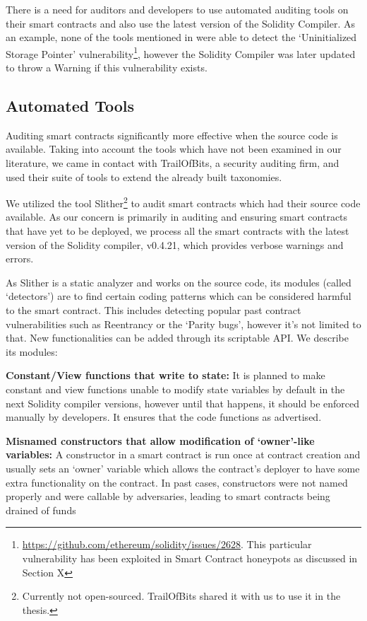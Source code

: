 There is a need for auditors and developers to use automated auditing tools on their smart contracts and also use the latest version of the Solidity  Compiler. As an example, none of the tools mentioned in \cite{tools} were able to detect the `Uninitialized Storage Pointer' vulnerability\footnote{\url{https://github.com/ethereum/solidity/issues/2628}. This particular vulnerability has been exploited in Smart Contract honeypots as discussed in Section X}, however the Solidity Compiler was later updated to throw a Warning if this vulnerability exists. 

\subsection{Automated Tools}

Auditing smart contracts significantly more effective when the source code is available. Taking into account the tools which have not been examined in our literature, we came in contact with TrailOfBits, a security auditing firm, and used their suite of tools to extend the already built taxonomies.

We utilized the tool Slither\footnote{Currently not open-sourced. TrailOfBits shared it with us to use it in the thesis.} to audit smart contracts which had their source code available. As our concern is primarily in auditing and ensuring smart contracts that have yet to be deployed, we process all the smart contracts with the latest version of the Solidity compiler, v0.4.21, which provides verbose warnings and errors. 

As Slither is a static analyzer and works on the source code, its modules (called `detectors') are to find certain coding patterns which can be considered harmful to the smart contract. This includes detecting popular past contract vulnerabilities such as Reentrancy or the `Parity bugs', however it's not limited to that. New functionalities can be added through its scriptable API. We describe its modules:

\textbf{Constant/View functions that write to state:} It is planned to make constant and view functions unable to modify state variables by default in the next Solidity compiler versions, however until that happens, it should be enforced manually by developers. It ensures that the code functions as advertised.

\textbf{Misnamed constructors that allow modification of `owner'-like variables:} A constructor in a smart contract is run once at contract creation and usually sets an `owner' variable which allows the contract's deployer to have some extra functionality on the contract. In past cases, constructors were not named properly and were callable by adversaries, leading to smart contracts being drained of funds \cite{Atzei:2017:SAE:3080353.3080363}

